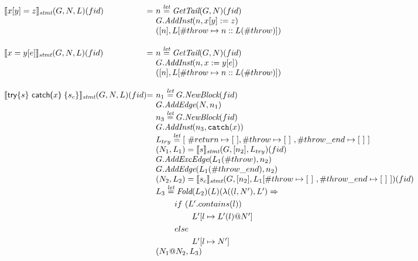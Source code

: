 \[
\begin{array}{l@{}l@{~}l}
\transfun{\irstore{x}{y}{z}}_{\emph{stmt}}(G,N,L)(fid) & = &
	n \letval \GetTail(G,N)(fid)\\
	& & G.\emph{AddInst}(n,x[y] := z)\\
	& & ([n],L[\#throw \mapsto n::L(\#throw)])\\
	& & \\

\transfun{\irload{x}{y}{e}}_{\emph{stmt}}(G,N,L)(fid) & = &
	n \letval \GetTail(G,N)(fid)\\
	& & G.\emph{AddInst}(n,x := y[e])\\
	& & ([n],L[\#throw \mapsto n::L(\#throw)])\\
	& & \\

\transfun{\irtrycat{s}{x}{s_c}}_{\emph{stmt}}(G,N,L)(fid) & = &
	n_1 \letval G.\emph{NewBlock}(fid)\\
	& & G.\emph{AddEdge}(N,n_1)\\
	& & n_3 \letval G.\emph{NewBlock}(fid)\\
	& & G.\emph{AddInst}(n_3,\TT{catch}(x))\\
	& & L_{try} \letval [\ \#return \mapsto [\ ], \#throw \mapsto [\ ]\ , \#throw\_end \mapsto [\ ]\ ] \\
	& & (N_1,L_1) = \transfun{s}_{\emph{stmt}}(G,[n_2],L_{try})(fid)\\
	& & G.\emph{AddExcEdge}(L_1(\#throw),n_2)\\
	& & G.\emph{AddEdge}(L_1(\#throw\_end),n_2)\\
	& & (N_2,L_2) = \transfun{s_c}_{\emph{stmt}}(G,[n_2],L_1[\#throw \mapsto [\ ]\ ,\#throw\_end \mapsto [\ ]\ ])(fid)\\
	& & L_3 \letval \Fold(L_2)(L)(\lambda((l,N'),L') \Rightarrow\\
	& & \phantom{L_3 \letval}if\ (L'.contains(l))\\
	& & \phantom{L_3 \letval \Fold} L'[l \mapsto L'(l)@N']\\
	& & \phantom{L_3 \letval}else\\
	& & \phantom{L_3 \letval \Fold} L'[l \mapsto N']\\
	& & (N_1@N_2, L_3)\\
	& & \\ 
	

\end{array}\]

